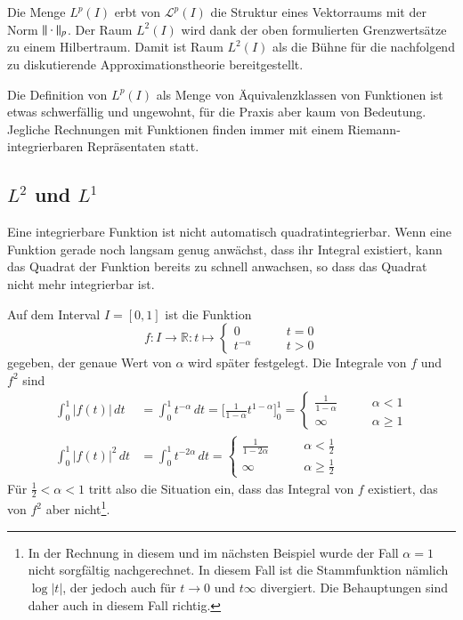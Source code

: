 Die Menge $L^p(I)$ erbt von $\mathcal{L}^p(I)$ die Struktur eines
Vektorraums mit der Norm $\|\mathstrut\cdot\mathstrut\|_p$.
Der Raum $L^2(I)$ wird dank der oben formulierten Grenzwertsätze zu
einem Hilbertraum.
Damit ist Raum $L^2(I)$ als die Bühne für die nachfolgend zu diskutierende
Approximationstheorie bereitgestellt.

Die Definition von $L^p(I)$ als Menge von Äquivalenzklassen von Funktionen
ist etwas schwerfällig und ungewohnt, für die Praxis aber kaum von Bedeutung.
Jegliche Rechnungen mit Funktionen finden immer mit einem
Riemann-integrierbaren Repräsentaten statt.


\subsection{$L^2$ und $L^1$}
Eine integrierbare Funktion ist nicht automatisch
quadratintegrierbar.
Wenn eine Funktion gerade noch langsam genug anwächst, dass ihr
Integral existiert, kann das Quadrat der Funktion bereits zu schnell
anwachsen, so dass das Quadrat nicht mehr integrierbar ist.

\begin{beispiel}
Auf dem Interval $I=[0,1]$ ist die Funktion
\[
f\colon I\to \mathbb R: t\mapsto \begin{cases} 0&\qquad t=0\\
t^{-\alpha}&\qquad t > 0
\end{cases}
\]
gegeben, der genaue Wert von $\alpha$ wird später festgelegt.
Die Integrale von $f$ und $f^2$ sind
\begin{align*}
\int_0^1 |f(t)|\,dt
&=
\int_0^1 t^{-\alpha}\,dt
=
\biggl[\frac{1}{1-\alpha}t^{1-\alpha}\biggr]_0^1
=
\begin{cases}
\frac{1}{1-\alpha}&\qquad \alpha < 1\\
\infty&\qquad \alpha \ge 1
\end{cases}
\\
\int_0^1|f(t)|^2\,dt
&=
\int_0^1 t^{-2\alpha}\,dt
=
\begin{cases}
\frac{1}{1-2\alpha}&\qquad \alpha < \frac12\\
\infty&\qquad \alpha \ge \frac12
\end{cases}
\end{align*}
Für $\frac12<\alpha<1$ tritt also die Situation ein, dass das Integral
von $f$ existiert, das von $f^2$ aber nicht\footnote{In der Rechnung in
diesem und im nächsten Beispiel wurde der Fall $\alpha=1$ nicht sorgfältig
nachgerechnet.
In diesem Fall ist die Stammfunktion nämlich $\log|t|$, der jedoch
auch für $t\to 0$ und $t\infty$ divergiert.
Die Behauptungen sind daher auch in diesem Fall richtig.}.
\end{beispiel}

